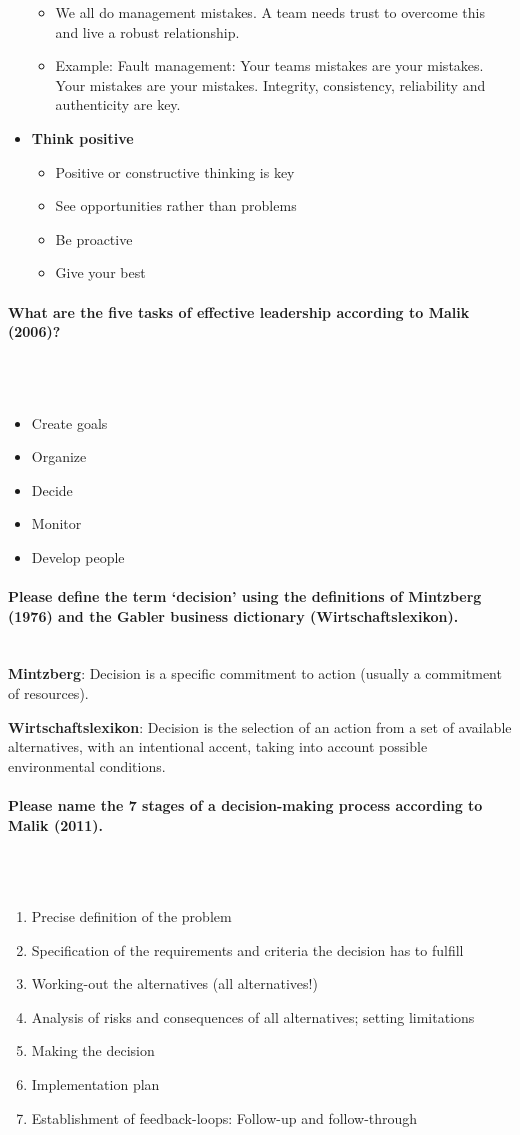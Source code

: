 \documentclass[10pt,a4paper,noendnumber=true]{scrartcl}
\newcommand{\properparagraph}[1]{\paragraph{\textcolor{Emerald}{#1}}\mbox{}\\}
\begin{document}
\begin{itemize}
		\begin{itemize}
			\item We all do management mistakes. A team needs trust to overcome this and live a robust relationship.
			\item Example: Fault management: Your teams mistakes are your mistakes. Your mistakes are your mistakes. Integrity, consistency, reliability and authenticity are key.
		\end{itemize}
		\item \textbf{Think positive}
		\begin{itemize}
			\item Positive or constructive thinking is key
			\item See opportunities rather than problems
			\item Be proactive
			\item Give your best
		\end{itemize}
\end{itemize}

\properparagraph{What are the five tasks of effective leadership according to Malik (2006)?}
\\[-6ex]
\begin{itemize}
	\item Create goals
	\item Organize
	\item Decide
	\item Monitor
	\item Develop people
\end{itemize}

\properparagraph{Please define the term ‘decision’ using the definitions of Mintzberg (1976) and the Gabler business dictionary (Wirtschaftslexikon).}
\textbf{Mintzberg}: Decision is a specific commitment to action (usually a commitment of resources).

\textbf{Wirtschaftslexikon}: Decision is the selection of an action from a set of available alternatives, with an intentional accent, taking into account possible environmental conditions.

\properparagraph{Please name the 7 stages of a decision-making process according to Malik (2011).}
\\[-6ex]
\begin{enumerate}
	\item Precise definition of the problem
	\item Specification of the requirements and criteria the decision has to fulfill
	\item Working-out the alternatives (all alternatives!)
	\item Analysis of risks and consequences of all alternatives; setting limitations
	\item Making the decision
	\item Implementation plan
	\item Establishment of feedback-loops: Follow-up and follow-through
\end{enumerate}
\end{document}
